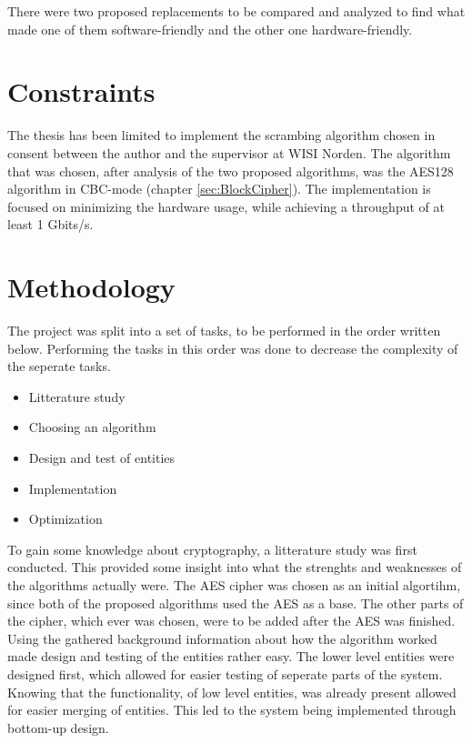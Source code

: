 There were two proposed replacements to be compared and analyzed 
to find what made one of them software-friendly and the other one 
hardware-friendly. 

\section{Constraints}
The thesis has been limited to implement the scrambing algorithm 
chosen in consent between the author and the supervisor at WISI 
Norden. The algorithm that was chosen, after analysis of the two 
proposed algorithms, was the AES128 algorithm in CBC-mode (chapter 
\ref{sec:BlockCipher}). The implementation is focused on minimizing 
the hardware usage, while achieving a throughput of at least 1 Gbits/s.

\section{Methodology}
The project was split into a set of tasks, to be performed in the 
order written below. Performing the tasks in this order was done to 
decrease the complexity of the seperate tasks.

\begin{itemize}
\item Litterature study
\item Choosing an algorithm
\item Design and test of entities
\item Implementation
\item Optimization
\end{itemize}

To gain some knowledge about cryptography, a litterature study was 
first conducted. This provided some insight into what the strenghts 
and weaknesses of the algorithms actually were. The AES cipher was 
chosen as an initial algortihm, since both of the proposed algorithms 
used the AES as a base. The other parts of the cipher, which ever was 
chosen, were to be added after the AES was finished. Using the 
gathered background information about how the algorithm worked made 
design and testing of the entities rather easy. The lower level 
entities were designed first, which allowed for easier testing of 
seperate parts of the system. Knowing that the functionality, of low 
level entities, was already present allowed for easier merging of 
entities. This led to the system being implemented through bottom-up 
design.
